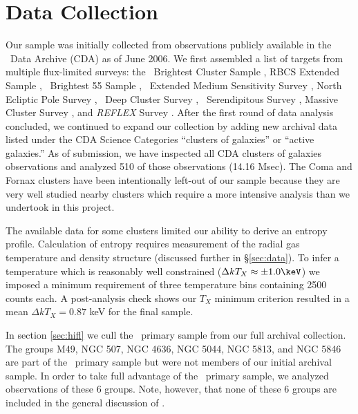 \documentclass[apj]{emulateapj}
\begin{document}
\section{Data Collection}
\label{sec:sample}

Our sample was initially collected from observations publicly
available in the \chandra\ Data Archive (CDA) as of June 2006. We
first assembled a list of targets from multiple flux-limited surveys:
the \rosat\ Brightest Cluster Sample \citep{1998MNRAS.301..881E}, RBCS
Extended Sample \citep{2000MNRAS.318..333E}, \rosat\ Brightest 55
Sample \citep{1990MNRAS.245..559E, 1998MNRAS.298..416P},
\einstein\ Extended Medium Sensitivity Survey
\citep{1990ApJS...72..567G}, North Ecliptic Pole Survey
\citep{2006ApJS..162..304H}, \rosat\ Deep Cluster Survey
\citep{1995ApJ...445L..11R}, \rosat\ Serendipitous Survey
\citep{1998ApJ...502..558V}, Massive Cluster Survey
\citep{2001ApJ...553..668E}, and {\it{REFLEX}} Survey
\citep{reflex}. After the first round of data analysis concluded, we
continued to expand our collection by adding new archival data listed
under the CDA Science Categories ``clusters of galaxies'' or ``active
galaxies.'' As of submission, we have inspected all CDA clusters of
galaxies observations and analyzed 510 of those observations (14.16
Msec). The Coma and Fornax clusters have been intentionally left-out
of our sample because they are very well studied nearby clusters which
require a more intensive analysis than we undertook in this project.

The available data for some clusters limited our ability to derive an
entropy profile. Calculation of entropy requires measurement of the
radial gas temperature and density structure (discussed further in
\S\ref{sec:data}). To infer a temperature which is reasonably well
constrained ($\Delta kT_X \approx \pm 1.0 \keV$) we imposed a minimum
requirement of three temperature bins containing 2500 counts each. A
post-analysis check shows our $T_X$ minimum criterion resulted in a
mean $\Delta kT_X = 0.87$ keV for the final sample.

In section \ref{sec:hifl} we cull the \hifl\ primary sample
\citep{hiflugcs1, hiflugcs2} from our full archival collection. The
groups M49, NGC 507, NGC 4636, NGC 5044, NGC 5813, and NGC 5846 are
part of the \hifl\ primary sample but were not members of our initial
archival sample. In order to take full advantage of the \hifl\ primary
sample, we analyzed observations of these 6 groups. Note, however,
that none of these 6 groups are included in the general discussion of
\accept.
\end{document}
